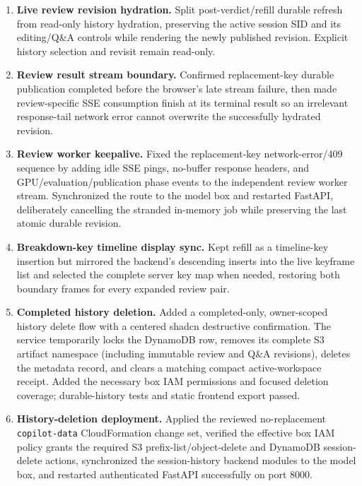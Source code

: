 \begin{enumerate}
  \item \textbf{Live review revision hydration.} Split post-verdict/refill durable refresh from read-only history hydration, preserving the active session SID and its editing/Q\&A controls while rendering the newly published revision. Explicit history selection and revisit remain read-only.
  \item \textbf{Review result stream boundary.} Confirmed replacement-key durable publication completed before the browser's late stream failure, then made review-specific SSE consumption finish at its terminal result so an irrelevant response-tail network error cannot overwrite the successfully hydrated revision.
  \item \textbf{Review worker keepalive.} Fixed the replacement-key network-error/409 sequence by adding idle SSE pings, no-buffer response headers, and GPU/evaluation/publication phase events to the independent review worker stream. Synchronized the route to the model box and restarted FastAPI, deliberately cancelling the stranded in-memory job while preserving the last atomic durable revision.
  \item \textbf{Breakdown-key timeline display sync.} Kept refill as a timeline-key insertion but mirrored the backend's descending inserts into the live keyframe list and selected the complete server key map when needed, restoring both boundary frames for every expanded review pair.
  \item \textbf{Completed history deletion.} Added a completed-only, owner-scoped history delete flow with a centered shadcn destructive confirmation. The service temporarily locks the DynamoDB row, removes its complete S3 artifact namespace (including immutable review and Q\&A revisions), deletes the metadata record, and clears a matching compact active-workspace receipt. Added the necessary box IAM permissions and focused deletion coverage; durable-history tests and static frontend export passed.
  \item \textbf{History-deletion deployment.} Applied the reviewed no-replacement \texttt{copilot-data} CloudFormation change set, verified the effective box IAM policy grants the required S3 prefix-list/object-delete and DynamoDB session-delete actions, synchronized the session-history backend modules to the model box, and restarted authenticated FastAPI successfully on port 8000.
\end{enumerate}
